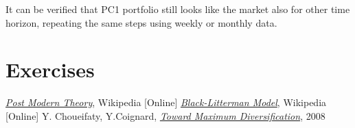 It can be verified that PC1 portfolio still looks like the market also for other time horizon, repeating the same steps using weekly or monthly data.

\section*{Exercises}


\begin{thebibliography}{9}
\href{https://en.wikipedia.org/wiki/Post-modern_portfolio_theory}{\emph{Post Modern Theory}}, Wikipedia [Online]
\href{https://en.wikipedia.org/wiki/Black\%E2\%80\%93Litterman_model}{\emph{Black-Litterman Model}}, Wikipedia [Online]
 Y. Choueifaty, Y.Coignard, \href{ https://www.tobam.fr/wp-content/uploads/2014/12/TOBAM-JoPM-Maximum-Div-2008.pdf}{\emph{Toward Maximum Diversification}}, 2008
\end{thebibliography}
